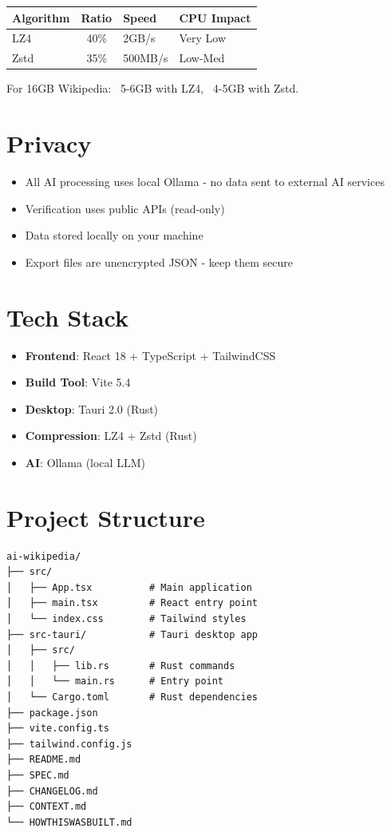 \documentclass[11pt,a4paper]{article}
\begin{document}
\begin{tabular}{|l|l|l|l|}
    \hline
    Algorithm & Ratio & Speed & CPU Impact \\
    \hline
    LZ4 & ~40\% & 2GB/s & Very Low \\
    Zstd & ~35\% & 500MB/s & Low-Med \\
    \hline
\end{tabular}

For 16GB Wikipedia: ~5-6GB with LZ4, ~4-5GB with Zstd.

\section{Privacy}

\begin{itemize}
    \item All AI processing uses local Ollama - no data sent to external AI services
    \item Verification uses public APIs (read-only)
    \item Data stored locally on your machine
    \item Export files are unencrypted JSON - keep them secure
\end{itemize}

\section{Tech Stack}

\begin{itemize}
    \item \textbf{Frontend}: React 18 + TypeScript + TailwindCSS
    \item \textbf{Build Tool}: Vite 5.4
    \item \textbf{Desktop}: Tauri 2.0 (Rust)
    \item \textbf{Compression}: LZ4 + Zstd (Rust)
    \item \textbf{AI}: Ollama (local LLM)
\end{itemize}

\section{Project Structure}

\begin{verbatim}
ai-wikipedia/
├── src/
│   ├── App.tsx          # Main application
│   ├── main.tsx         # React entry point
│   └── index.css        # Tailwind styles
├── src-tauri/           # Tauri desktop app
│   ├── src/
│   │   ├── lib.rs       # Rust commands
│   │   └── main.rs      # Entry point
│   └── Cargo.toml       # Rust dependencies
├── package.json
├── vite.config.ts
├── tailwind.config.js
├── README.md
├── SPEC.md
├── CHANGELOG.md
├── CONTEXT.md
└── HOWTHISWASBUILT.md
\end{verbatim}
\end{document}
